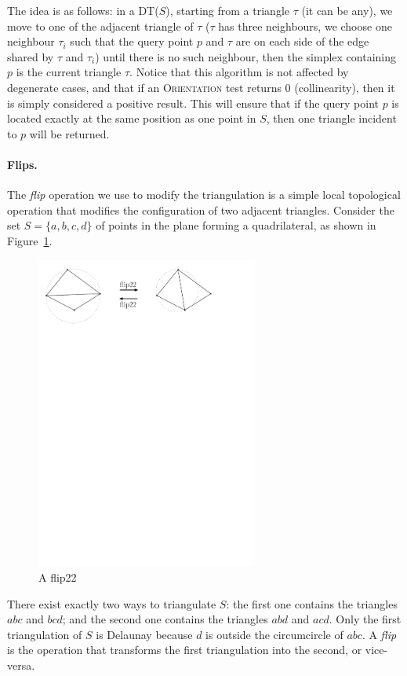 The idea is as follows: in a DT($S$), starting from a triangle $\tau$ (it can be any), we move to one of the adjacent triangle of $\tau$ ($\tau$ has three neighbours, we choose one neighbour $\tau_i$ such that the query point $p$ and $\tau$ are on each side of the edge shared by $\tau$ and $\tau_i$) until there is no such neighbour, then the simplex containing $p$ is the current triangle $\tau$.
Notice that this algorithm is not affected by degenerate cases, and that if an \textrm{O}\textsc{rientation} test returns 0 (collinearity), then it is simply considered a positive result. 
This will ensure that if the query point $p$ is located exactly at the same position as one point in $S$, then one triangle incident to $p$ will be returned.


\paragraph{Flips.}The \emph{flip} operation we use to modify the triangulation is a simple local topological operation that modifies the configuration of two adjacent triangles. 
Consider the set $S = \{a, b, c, d\}$ of points in the plane forming a quadrilateral, as shown in Figure~\ref{p:flip22}. 
\begin{figure}
  \centering
  \includegraphics[width=0.65\textwidth]{figs/flip22}
  \caption{A flip22}
\label{p:flip22}
\end{figure}
There exist exactly two ways to triangulate $S$: the first one contains the triangles $abc$ and $bcd$; and the second one contains the triangles $abd$ and $acd$. 
Only the first triangulation of $S$ is Delaunay because $d$ is outside the circumcircle of $abc$. 
A \emph{flip} is the operation that transforms the first triangulation into the second, or vice-versa.


